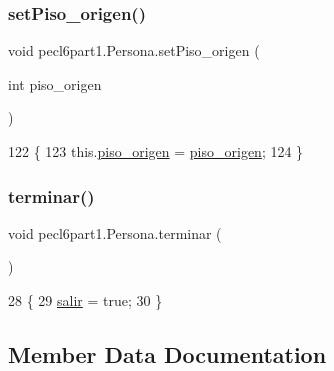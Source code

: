 \subsubsection{\texorpdfstring{set\+Piso\+\_\+origen()}{setPiso\_origen()}}
{\footnotesize\ttfamily void pecl6part1.\+Persona.\+set\+Piso\+\_\+origen (\begin{DoxyParamCaption}\item[{int}]{piso\+\_\+origen }\end{DoxyParamCaption})\hspace{0.3cm}{\ttfamily [inline]}}


\begin{DoxyCode}
122                                                 \{
123         this.\mbox{\hyperlink{classpecl6part1_1_1_persona_a6a8187e7b1c423eb263a336a573d634f}{piso\_origen}} = \mbox{\hyperlink{classpecl6part1_1_1_persona_a6a8187e7b1c423eb263a336a573d634f}{piso\_origen}};
124     \}
\end{DoxyCode}
\mbox{\label{classpecl6part1_1_1_persona_aa12dc3804209c0efb920b2fda7d1fbbd}} 
\subsubsection{\texorpdfstring{terminar()}{terminar()}}
{\footnotesize\ttfamily void pecl6part1.\+Persona.\+terminar (\begin{DoxyParamCaption}{ }\end{DoxyParamCaption})\hspace{0.3cm}{\ttfamily [inline]}}


\begin{DoxyCode}
28     \{
29         \mbox{\hyperlink{classpecl6part1_1_1_persona_aaf35f4def1c5244a3e8d464a88e66243}{salir}} = \textcolor{keyword}{true};
30     \}
\end{DoxyCode}


\subsection{Member Data Documentation}
\mbox{\label{classpecl6part1_1_1_persona_a4a61953407b3ad73a3dfcc9314f36d73}} 
